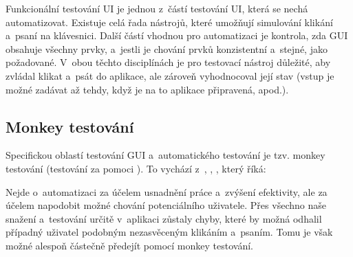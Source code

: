 		Funkcionální testování UI je jednou z~částí testování UI, která se nechá automatizovat. Existuje celá řada nástrojů, které umožňují simulování klikání a~psaní na klávesnici. Další částí vhodnou pro automatizaci je kontrola, zda GUI obsahuje všechny prvky, a~jestli je chování prvků konzistentní a~stejné, jako požadované. V~obou těchto disciplínách je pro testovací nástroj důležité, aby zvládal klikat a~psát do aplikace, ale zároveň vyhodnocoval její stav (vstup je možné zadávat až tehdy, když je na to aplikace připravená, apod.).
		
			\subsection{Monkey testování}\label{MonkeyTestovani}
			Specifickou oblastí testování GUI a~automatického testování je tzv. monkey testování (testování za pomoci ). To vychází z~, \citep{Patton}, \citep{Teorem}, který říká: 
			
			Nejde o~automatizaci za účelem usnadnění práce a~zvýšení efektivity, ale za účelem napodobit možné chování potenciálního uživatele. Přes všechno naše snažení a~testování určitě v~aplikaci zůstaly chyby, které by možná odhalil případný uživatel podobným nezasvěceným klikáním a~psaním. Tomu je však možné alespoň částečně předejít pomocí monkey testování.